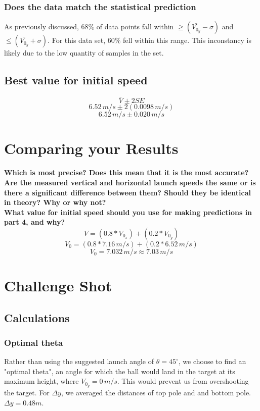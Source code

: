 \documentclass[11pt, letterpaper, includehead]{article}
\begin{document}
\subsubsection{Does the data match the statistical prediction} 
As previously discussed, $68\%$ of 
data points fall within $\geq (\bar{V_{0_y}} - \sigma)$ and $\leq (\bar{V_{0_y}} + \sigma)$. 
For this data set, $60\%$ fell within this range. This inconstancy is likely due to the 
low quantity of samples in the set. 

\subsection{Best value for initial speed} %
$$\bar{V} \pm 2SE$$
$$6.52\, m/s \pm 2( 0.0098 \, m/s)$$
$$\boxed{6.52\, m/s \pm 0.020 \, m/s}$$

\section{Comparing your Results} %
\textbf{Which is most precise? Does this mean that it is the most accurate?}\\ 

\textbf{Are the measured vertical and horizontal launch speeds the same or is there a
significant difference between them? Should they be identical in theory? Why or
why not?}\\

\textbf{What value for initial speed should you use for making predictions in part 4, and
why?}
$$V = (0.8 * V_{0_x}) + (0.2 * V_{0_y})$$
$$V_0 = (0.8 * 7.16\,m/s) + (0.2 * 6.52\,m/s)$$
$$V_0 = 7.032\,m/s \approx 7.03\,m/s$$

\section{Challenge Shot} %
\subsection{Calculations} %
\subsubsection{Optimal theta} %
Rather than using the suggested launch angle of $\theta = 45^{\circ}$, we choose
to find an "optimal theta", an angle for which the ball would land in the 
target at its maximum height, where $V_{0_y} = 0\,m/s$. This would prevent us from 
overshooting the target. For $\Delta y$, we averaged the 
distances of top pole and and bottom pole. $\Delta y = 0.48m$.
\end{document}
